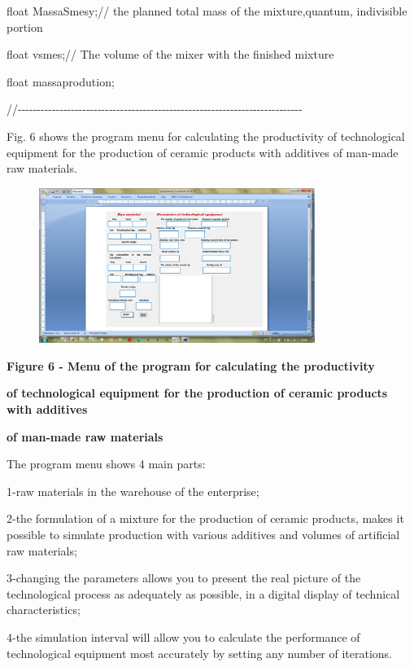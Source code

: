 float MassaSmesy;// the planned total mass of the mixture,quantum,
indivisible portion

float vsmes;// The volume of the mixer with the finished mixture

float massaprodution;

//-\/-\/-\/-\/-\/-\/-\/-\/-\/-\/-\/-\/-\/-\/-\/-\/-\/-\/-\/-\/-\/-\/-\/-\/-\/-\/-\/-\/-\/-\/-\/-\/-\/-\/-\/-\/-\/-\/-\/-\/-\/-\/-\/-\/-\/-\/-\/-\/-\/-\/-\/-\/-\/-\/-\/-\/-\/-\/-\/-\/-\/-\/-\/-\/-\/-\/-\/-\/-\/-\/-\/-\/-\/-\/-

Fig. 6 shows the program menu for calculating the productivity of
technological equipment for the production of ceramic products with
additives of man-made raw materials.

\begin{figure}[H]
	\centering
	\includegraphics[width=0.8\textwidth]{assets/272}
	\caption*{}
\end{figure}

{\bfseries Figure 6 - Menu of the program for calculating the productivity}

{\bfseries of technological equipment for the production of ceramic
products with additives}

{\bfseries of man-made raw materials}

The program menu shows 4 main parts:

1-raw materials in the warehouse of the enterprise;

2-the formulation of a mixture for the production of ceramic products,
makes it possible to simulate production with various additives and
volumes of artificial raw materials;

3-changing the parameters allows you to present the real picture of the
technological process as adequately as possible, in a digital display of
technical characteristics;

4-the simulation interval will allow you to calculate the performance of
technological equipment most accurately by setting any number of
iterations.

